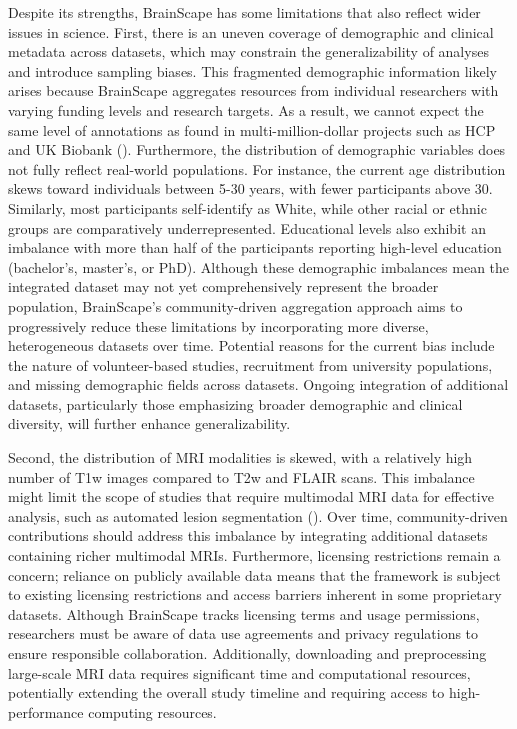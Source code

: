 Despite its strengths, BrainScape has some limitations that also reflect wider issues in science.
First, there is an uneven coverage of demographic and clinical metadata across datasets, 
which may constrain the generalizability of analyses and introduce sampling biases. 
This fragmented demographic information likely arises because BrainScape aggregates resources from individual researchers 
with varying funding levels and research targets. 
As a result, we cannot expect the same level of annotations as found in multi-million-dollar projects 
such as HCP and UK Biobank (\cite{van2013wu, miller2016multimodal}).
Furthermore, the distribution of demographic variables does not fully reflect real-world populations. 
For instance, the current age distribution skews toward individuals between 5-30 years, with fewer participants above 30.
Similarly, most participants self-identify as White, while other racial or ethnic groups are comparatively underrepresented. 
Educational levels also exhibit an imbalance with more than half of the participants reporting high-level education (bachelor's, master's, or PhD).
Although these demographic imbalances mean the integrated dataset may not yet comprehensively represent 
the broader population, BrainScape's community-driven aggregation approach aims to progressively reduce 
these limitations by incorporating more diverse, heterogeneous datasets over time.
Potential reasons for the current bias include the nature of volunteer-based studies, 
recruitment from university populations, and missing demographic fields across datasets. 
Ongoing integration of additional datasets, particularly those emphasizing broader demographic 
and clinical diversity, will further enhance generalizability. 


Second, the distribution of MRI modalities is skewed, with a relatively high number of T1w images compared to T2w and FLAIR scans. 
This imbalance might limit the scope of studies that require multimodal MRI data for effective analysis, such as automated lesion segmentation (\cite{menze2014multimodal, spitzer2022interpretable}). 
Over time, community-driven contributions should address this imbalance by integrating additional datasets containing richer multimodal MRIs. 
Furthermore, licensing restrictions remain a concern; reliance on publicly available data means that the framework is subject to existing licensing restrictions 
and access barriers inherent in some proprietary datasets.
Although BrainScape tracks licensing terms and usage permissions, researchers must be aware of 
data use agreements and privacy regulations to ensure responsible collaboration. 
Additionally, downloading and preprocessing large-scale MRI data requires significant time and computational resources, 
potentially extending the overall study timeline and requiring access to high-performance computing resources.

